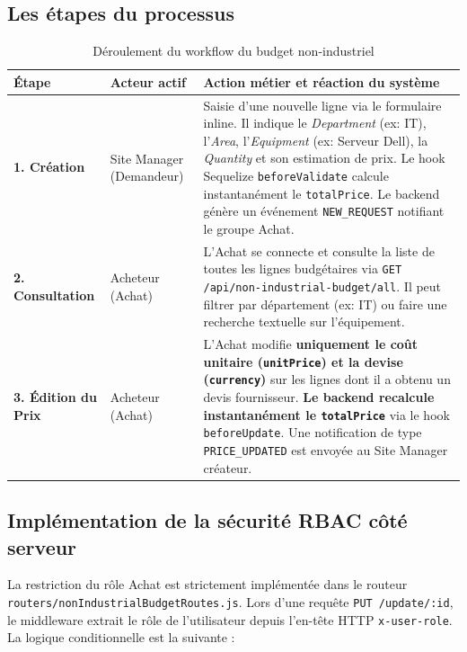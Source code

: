\subsection{Les étapes du processus}
\begin{table}[h]
\centering
\begin{tabular}{|p{2cm}|p{3.5cm}|p{9.5cm}|}
\hline
\textbf{Étape} & \textbf{Acteur actif} & \textbf{Action métier et réaction du système} \\ \hline
\textbf{1. Création} & Site Manager (Demandeur) & Saisie d'une nouvelle ligne via le formulaire inline. Il indique le \textit{Department} (ex: IT), l'\textit{Area}, l'\textit{Equipment} (ex: Serveur Dell), la \textit{Quantity} et son estimation de prix. Le hook Sequelize \texttt{beforeValidate} calcule instantanément le \texttt{totalPrice}. Le backend génère un événement \texttt{NEW\_REQUEST} notifiant le groupe Achat. \\ \hline
\textbf{2. Consultation} & Acheteur (Achat) & L'Achat se connecte et consulte la liste de toutes les lignes budgétaires via \texttt{GET /api/non-industrial-budget/all}. Il peut filtrer par département (ex: IT) ou faire une recherche textuelle sur l'équipement. \\ \hline
\textbf{3. Édition du Prix} & Acheteur (Achat) & L'Achat modifie \textbf{uniquement le coût unitaire (\texttt{unitPrice}) et la devise (\texttt{currency})} sur les lignes dont il a obtenu un devis fournisseur. \textbf{Le backend recalcule instantanément le \texttt{totalPrice}} via le hook \texttt{beforeUpdate}. Une notification de type \texttt{PRICE\_UPDATED} est envoyée au Site Manager créateur. \\ \hline
\end{tabular}
\caption{Déroulement du workflow du budget non-industriel}
\label{tab:workflow_budget}
\end{table}

\subsection{Implémentation de la sécurité RBAC côté serveur}
La restriction du rôle Achat est strictement implémentée dans le routeur \texttt{routers/nonIndustrialBudgetRoutes.js}. Lors d'une requête \texttt{PUT /update/:id}, le middleware extrait le rôle de l'utilisateur depuis l'en-tête HTTP \texttt{x-user-role}. La logique conditionnelle est la suivante :

